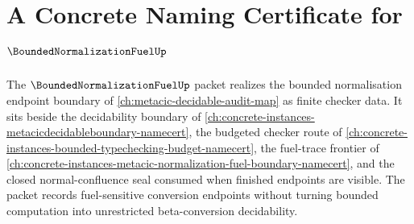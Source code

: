 \chapter{A Concrete Naming Certificate for $\BoundedNormalizationFuelUp$}
\label{ch:concrete-instances-bounded-normalization-fuel-namecert}

The $\BoundedNormalizationFuelUp$ packet realizes the bounded normalisation endpoint boundary of \autoref{ch:metacic-decidable-audit-map} as finite checker data. It sits beside the decidability boundary of \autoref{ch:concrete-instances-metacicdecidableboundary-namecert}, the budgeted checker route of \autoref{ch:concrete-instances-bounded-typechecking-budget-namecert}, the fuel-trace frontier of \autoref{ch:concrete-instances-metacic-normalization-fuel-boundary-namecert}, and the closed normal-confluence seal consumed when finished endpoints are visible. The packet records fuel-sensitive conversion endpoints without turning bounded computation into unrestricted beta-conversion decidability.


